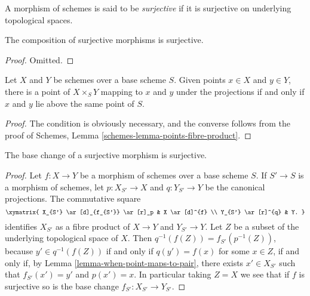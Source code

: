 \begin{definition}
\label{definition-surjective}
A morphism of schemes is said to be {\it surjective}
if it is surjective on underlying topological
spaces.
\end{definition}

\begin{lemma}
\label{lemma-composition-surjective}
The composition of surjective morphisms is surjective.
\end{lemma}

\begin{proof}
Omitted.
\end{proof}

\begin{lemma}
\label{lemma-when-point-maps-to-pair}
Let $X$ and $Y$ be schemes over a base scheme $S$. Given points $x \in X$ and
$y \in Y$, there is a point of $X \times_S Y$ mapping to $x$ and $y$ under the
projections if and only if $x$ and $y$ lie above the same point of $S$.
\end{lemma}

\begin{proof}
The condition is obviously necessary, and the converse follows from the proof
of Schemes, Lemma \ref{schemes-lemma-points-fibre-product}.
\end{proof}

\begin{lemma}
\label{lemma-base-change-surjective}
The base change of a surjective morphism is surjective.
\end{lemma}

\begin{proof}
Let $f: X \to Y$ be a morphism of schemes over a base scheme $S$.
If $S' \to S$ is a morphism of schemes, let $p: X_{S'} \to X$
and $q: Y_{S'} \to Y$ be the canonical projections.  The commutative
square
$$
\xymatrix{
X_{S'} \ar[d]_{f_{S'}} \ar[r]_p & X \ar[d]^{f} \\
Y_{S'} \ar[r]^{q} & Y.
}
$$
identifies $X_{S'}$ as a fibre product of $X \to Y$ and
$Y_{S'} \to Y$.  Let $Z$ be a subset of the underlying topological
space of $X$.  Then $q^{-1}(f(Z)) = f_{S'}(p^{-1}(Z))$, because
$y' \in q^{-1}(f(Z))$ if and only if $q(y') = f(x)$ for some $x \in Z$,
if and only if, by Lemma \ref{lemma-when-point-maps-to-pair}, there exists
$x' \in X_{S'}$ such that $f_{S'}(x') = y'$ and $p(x') = x$.  In particular
taking $Z = X$ we see that if $f$ is surjective so is the base change
$f_{S'}: X_{S'} \to Y_{S'}$.
\end{proof}

